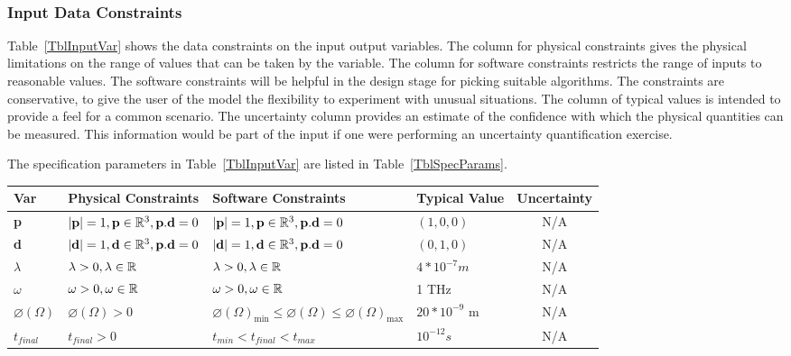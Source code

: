 \documentclass[12pt]{article}
\begin{document}
	~\newline
	
	

	
	
	\subsubsection{Input Data Constraints} \label{sec_DataConstraints}
	
	Table~\ref{TblInputVar} shows the data constraints on the input output
	variables.  The column for physical constraints gives the physical limitations
	on the range of values that can be taken by the variable.  The column for
	software constraints restricts the range of inputs to reasonable values.  The
	software constraints will be helpful in the design stage for picking suitable
	algorithms.  The constraints are conservative, to give the user of the model the
	flexibility to experiment with unusual situations.  The column of typical values
	is intended to provide a feel for a common scenario.  The uncertainty column
	provides an estimate of the confidence with which the physical quantities can be
	measured.  This information would be part of the input if one were performing an
	uncertainty quantification exercise.
	
	The specification parameters in Table~\ref{TblInputVar} are listed in
	Table~\ref{TblSpecParams}.
	
	\begin{table}[!h] \caption{Input Variables} \label{TblInputVar} \renewcommand{\arraystretch}{1.2} \noindent \begin{longtable*}{l l l l c} \toprule \textbf{Var} & \textbf{Physical Constraints} & \textbf{Software Constraints} & \textbf{Typical Value} & Uncertainty\\ \midrule 
			\textbf{p} & $|\textbf{p}|=1,  \textbf{p} \in \Bbb R^{3} , \textbf{p}.\textbf{d}=0$ & $|\textbf{p}|=1, \textbf{p} \in \Bbb R^{3}, \textbf{p}.\textbf{d}=0$ & $(1,0,0)$ & N/A \\
			\textbf{d} & $|\textbf{d}|=1,  \textbf{d} \in \Bbb R^{3}, \textbf{p}.\textbf{d}=0$ & $|\textbf{d}|=1, \textbf{d} \in \Bbb R^{3}, \textbf{p}.\textbf{d}=0$ & $(0,1,0)$& N/A\\
			$\lambda$ & $\lambda>0,  \lambda \in \Bbb R$ & $\lambda>0, \lambda \in \Bbb R$ & $4 * 10^{-7} m$& N/A\\	 
			$\omega$ & $\omega > 0, \omega \in \Bbb R$ & $\omega > 0, \omega \in \Bbb R$ & 1 THz & N/A\\  
			$\varnothing(\Omega)$ & $\varnothing(\Omega) > 0$ & $\varnothing(\Omega)_{\text{min}} \leq \varnothing(\Omega) \leq \varnothing(\Omega)_{\text{max}}$ & $20*10^{-9}$ \si[per-mode=symbol] {\metre} & N/A \\ 
			$t_{final}$ & $t_{final}>0$ &   $t_{min} < t_{final} < t_{max}$ & $10^{-12} s$ & N/A\\
			 \bottomrule \end{longtable*} \end{table}
\end{document}
